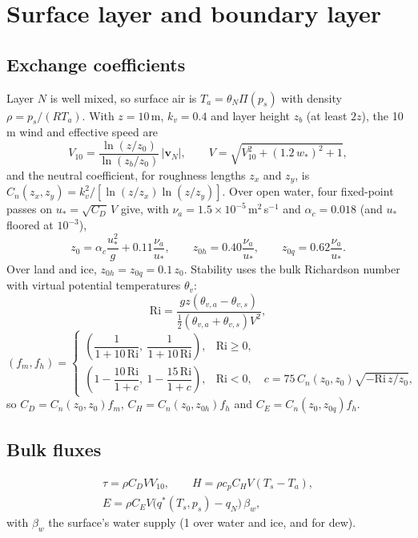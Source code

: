 \documentclass[11pt,a4paper]{article}
\newcommand{\vect}[1]{\bm{#1}}
\begin{document}
\section{Surface layer and boundary layer}

\subsection{Exchange coefficients}
Layer $N$ is well mixed, so surface air is $T_a = \theta_N\Pi(p_s)$ with
density $\rho = p_s/(RT_a)$. With $z = 10$\,m, $k_v = 0.4$ and layer height
$z_b$ (at least $2z$), the 10\,m wind and effective speed are
\begin{equation}
V_{10} = \frac{\ln(z/z_0)}{\ln(z_b/z_0)}\,|\vect{v}_N|, \qquad
V = \sqrt{V_{10}^2 + (1.2\,w_*)^2 + 1},
\end{equation}
and the neutral coefficient, for roughness lengths $z_x$ and $z_y$, is
$C_n(z_x,z_y) = k_v^2/[\ln(z/z_x)\ln(z/z_y)]$. Over open water, four fixed-point
passes on $u_* = \sqrt{C_D}\,V$ give, with $\nu_a = 1.5\times10^{-5}$\,m$^2$\,s$^{-1}$
and $\alpha_c = 0.018$ (and $u_*$ floored at $10^{-3}$),
\begin{equation}
z_0 = \alpha_c\frac{u_*^2}{g} + 0.11\frac{\nu_a}{u_*}, \qquad
z_{0h} = 0.40\frac{\nu_a}{u_*}, \qquad z_{0q} = 0.62\frac{\nu_a}{u_*}.
\end{equation}
Over land and ice, $z_{0h} = z_{0q} = 0.1\,z_0$. Stability uses the bulk Richardson
number with virtual potential temperatures $\theta_v$:
\begin{equation}
\mathrm{Ri} = \frac{gz(\theta_{v,a} - \theta_{v,s})}{\tfrac12(\theta_{v,a} + \theta_{v,s})V^2},
\end{equation}
\begin{equation}
(f_m, f_h) = \begin{cases}
\left(\dfrac{1}{1 + 10\,\mathrm{Ri}},\ \dfrac{1}{1 + 10\,\mathrm{Ri}}\right), & \mathrm{Ri} \ge 0,\\[2.5ex]
\left(1 - \dfrac{10\,\mathrm{Ri}}{1+c},\ 1 - \dfrac{15\,\mathrm{Ri}}{1+c}\right), &
\mathrm{Ri} < 0,\quad c = 75\,C_n(z_0,z_0)\sqrt{-\mathrm{Ri}\,z/z_0},
\end{cases}
\end{equation}
so $C_D = C_n(z_0,z_0)f_m$, $C_H = C_n(z_0,z_{0h})f_h$ and $C_E = C_n(z_0,z_{0q})f_h$.

\subsection{Bulk fluxes}
\begin{gather}
\tau = \rho C_D V V_{10}, \qquad
H = \rho c_p C_H V (T_s - T_a), \\
E = \rho C_E V \bigl(q^*(T_s,p_s) - q_N\bigr)\,\beta_w,
\end{gather}
with $\beta_w$ the surface's water supply (1 over water and ice, and for dew).
\end{document}
